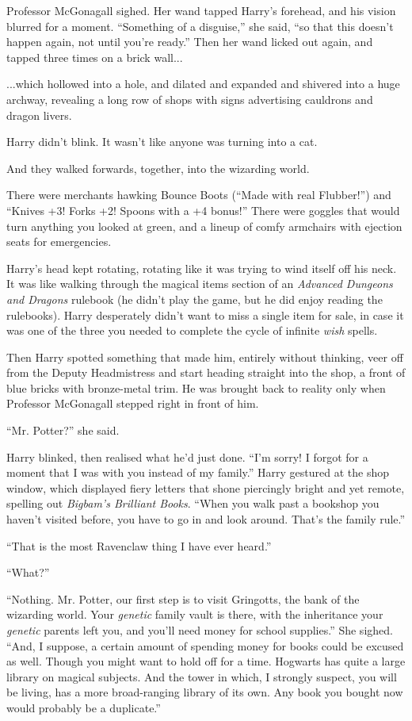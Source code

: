 Professor McGonagall sighed. Her wand tapped Harry's forehead, and his vision blurred for a moment. ``Something of a disguise,'' she said, ``so that this doesn't happen again, not until you're ready.'' Then her wand licked out again, and tapped three times on a brick wall...

...which hollowed into a hole, and dilated and expanded and shivered into a huge archway, revealing a long row of shops with signs advertising cauldrons and dragon livers.

Harry didn't blink. It wasn't like anyone was turning into a cat.

And they walked forwards, together, into the wizarding world.

There were merchants hawking Bounce Boots (``Made with real Flubber!'') and ``Knives +3! Forks +2! Spoons with a +4 bonus!'' There were goggles that would turn anything you looked at green, and a lineup of comfy armchairs with ejection seats for emergencies.

Harry's head kept rotating, rotating like it was trying to wind itself off his neck. It was like walking through the magical items section of an \emph{Advanced Dungeons and Dragons} rulebook (he didn't play the game, but he did enjoy reading the rulebooks). Harry desperately didn't want to miss a single item for sale, in case it was one of the three you needed to complete the cycle of infinite \emph{wish} spells.

Then Harry spotted something that made him, entirely without thinking, veer off from the Deputy Headmistress and start heading straight into the shop, a front of blue bricks with bronze-metal trim. He was brought back to reality only when Professor McGonagall stepped right in front of him.

``Mr. Potter?'' she said.

Harry blinked, then realised what he'd just done. ``I'm sorry! I forgot for a moment that I was with you instead of my family.'' Harry gestured at the shop window, which displayed fiery letters that shone piercingly bright and yet remote, spelling out \emph{Bigbam's Brilliant Books}. ``When you walk past a bookshop you haven't visited before, you have to go in and look around. That's the family rule.''

``That is the most Ravenclaw thing I have ever heard.''

``What?''

``Nothing. Mr. Potter, our first step is to visit Gringotts, the bank of the wizarding world. Your \emph{genetic} family vault is there, with the inheritance your \emph{genetic} parents left you, and you'll need money for school supplies.'' She sighed. ``And, I suppose, a certain amount of spending money for books could be excused as well. Though you might want to hold off for a time. Hogwarts has quite a large library on magical subjects. And the tower in which, I strongly suspect, you will be living, has a more broad-ranging library of its own. Any book you bought now would probably be a duplicate.''

